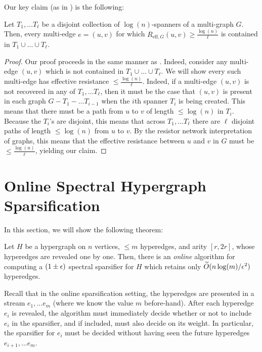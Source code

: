 \documentclass{article}
\begin{document}
Our key claim (as in \cite{ADKKP16}) is the following:

\begin{claim}\label{clm:largeERdisjointSpanners}
    Let $T_1, \dots T_{\ell}$ be a disjoint collection of $\log(n)$-spanners of a multi-graph $G$. Then, every multi-edge $e = (u,v)$ for which $R_{\mathrm{eff}, G}(u,v) \geq \frac{\log(n)}{\ell}$ is contained in $T_1 \cup \dots \cup T_{\ell}$.
\end{claim}

\begin{proof}
    Our proof proceeds in the same manner as \cite{ADKKP16}. Indeed, consider any multi-edge $(u,v)$ which is not contained in $T_1 \cup \dots \cup T_{\ell}$. We will show every such multi-edge has effective resistance $\leq \frac{\log(n)}{\ell}$. Indeed, if a multi-edge $(u,v)$ is not recovered in any of $T_1, \dots T_{\ell}$, then it must be the case that $(u,v)$ is present in each graph $G - T_1 - \dots T_{i-1}$ when the $i$th spanner $T_i$ is being created. This means that there must be a path from $u$ to $v$ of length $\leq \log(n)$ in $T_i$. Because the $T_i$'s are disjoint, this means that across $T_1, \dots T_{\ell}$ there are $\ell$ disjoint paths of length $\leq \log(n)$ from $u$ to $v$. By the resistor network interpretation of graphs, this means that the effective resistance between $u$ and $v$ in $G$ must be $\leq\frac{\log(n)}{\ell} $, yielding our claim. 
\end{proof}

\section{Online Spectral Hypergraph Sparsification}\label{sec:OnlineSpectral}

In this section, we will show the following theorem:

\begin{theorem}
    Let $H$ be a hypergraph on $n$ vertices, $\leq m$ hyperedges, and arity $[r, 2r]$, whose hyperedges are revealed one by one. Then, there is an \emph{online} algorithm for computing a $(1 \pm \epsilon)$ spectral sparsifier for $H$ which retains only $\widetilde{O}(n \log(m) / \epsilon^2)$ hyperedges. 
\end{theorem}

Recall that in the online sparsification setting, the hyperedges are presented in a stream $e_1, \dots e_m$ (where we know the value $m$ before-hand). After each hyperedge $e_i$ is revealed, the algorithm must immediately decide whether or not to include $e_i$ in the sparsifier, and if included, must also decide on its weight. In particular, the sparsifier for $e_i$ must be decided without having seen the future hyperedges $e_{i+1}, \dots e_m$. 
\end{document}
